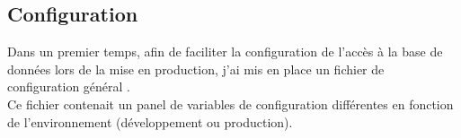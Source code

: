 \subsection{Configuration}
\vspace{1cm}

Dans un premier temps, afin de faciliter la configuration de l’accès à la base de données lors de la mise en production, j’ai mis en place un fichier de configuration général .\\
Ce fichier contenait un panel de variables de configuration différentes en fonction de l’environnement (développement ou production).